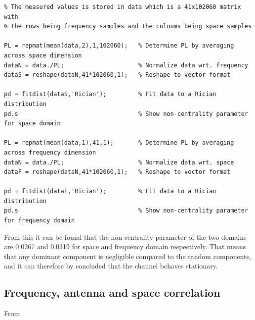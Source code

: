 \begin{lstlisting}
% The measured values is stored in data which is a 41x102060 matrix with
% the rows being frequency samples and the coloums being space samples

PL = repmat(mean(data,2),1,102060);   % Determine PL by averaging across space dimension 
dataN = data./PL;                     % Normalize data wrt. frequency
dataS = reshape(dataN,41*102060,1);   % Reshape to vector format

pd = fitdist(dataS,'Rician');         % Fit data to a Rician distribution
pd.s                                  % Show non-centrality parameter for space domain

PL = repmat(mean(data,1),41,1);       % Determine PL by averaging across frequency dimension
dataN = data./PL;                     % Normalize data wrt. space
dataF = reshape(dataN,41*102060,1);   % Reshape to vector format

pd = fitdist(dataF,'Rician');         % Fit data to a Rician distribution
pd.s                                  % Show non-centrality parameter for frequency domain
\end{lstlisting}

From this it can be found that the non-centrality parameter of the two domains are 0.0267 and 0.0319 for space and frequency domain respectively. That means that any dominant component is negligible compared to the random components, and it can therefore by concluded that the channel behaves stationary.

%
%


\subsection{Frequency, antenna and space correlation}
From 

\begin{minipage}{0.33\textwidth}

\end{minipage}%
\begin{minipage}{0.33\textwidth}

\end{minipage}%
\begin{minipage}{0.33\textwidth}

\end{minipage}


